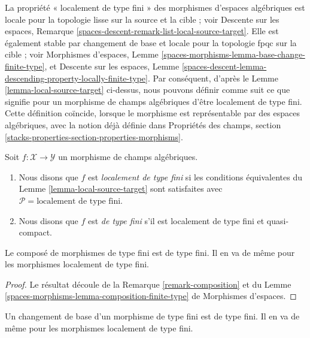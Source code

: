 \noindent
La propriété « localement de type fini » des morphismes d'espaces
algébriques est locale pour la topologie lisse sur la source et la cible ;
voir Descente sur les espaces, Remarque
\ref{spaces-descent-remark-list-local-source-target}.
Elle est également stable par changement de base et locale pour la
topologie fpqc sur la cible ; voir Morphismes d'espaces, Lemme
\ref{spaces-morphisms-lemma-base-change-finite-type}, et Descente sur les
espaces, Lemme
\ref{spaces-descent-lemma-descending-property-locally-finite-type}.
Par conséquent, d'après le Lemme \ref{lemma-local-source-target}
ci-dessus, nous pouvons définir comme suit ce que signifie pour un morphisme
de champs algébriques d'être localement de type fini. Cette définition
coïncide, lorsque le morphisme est représentable par des espaces algébriques,
avec la notion déjà définie dans Propriétés des champs, section
\ref{stacks-properties-section-properties-morphisms}.

\begin{definition}
\label{definition-locally-finite-type}
Soit $f : \mathcal{X} \to \mathcal{Y}$ un morphisme de champs algébriques.
\begin{enumerate}
\item Nous disons que $f$ est {\it localement de type fini} si les
conditions équivalentes du Lemme \ref{lemma-local-source-target}
sont satisfaites avec
$\mathcal{P} = \text{localement de type fini}$.
\item Nous disons que $f$ est {\it de type fini} s'il est localement
de type fini et quasi-compact.
\end{enumerate}
\end{definition}

\begin{lemma}
\label{lemma-composition-finite-type}
Le composé de morphismes de type fini est de type fini.
Il en va de même pour les morphismes localement de type fini.
\end{lemma}

\begin{proof}
Le résultat découle de la Remarque \ref{remark-composition} et du
Lemme \ref{spaces-morphisms-lemma-composition-finite-type} de Morphismes d'espaces.
\end{proof}

\begin{lemma}
\label{lemma-base-change-finite-type}
Un changement de base d'un morphisme de type fini est de type fini.
Il en va de même pour les morphismes localement de type fini.
\end{lemma}

